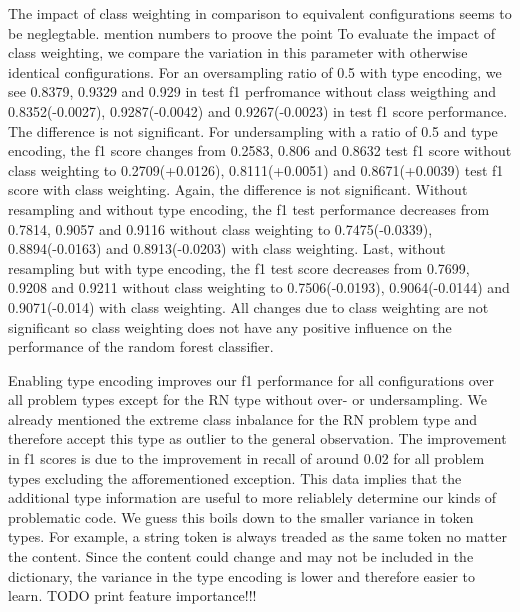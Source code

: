 The impact of class weighting in comparison to equivalent configurations seems to be neglegtable. 
mention numbers to proove the point
To evaluate the impact of class weighting, we compare the variation in this parameter with otherwise identical configurations.
For an oversampling ratio of 0.5 with type encoding, we see 0.8379, 0.9329 and 0.929 in test f1 perfromance without class weigthing and 0.8352(-0.0027), 0.9287(-0.0042) and 0.9267(-0.0023) in test f1 score performance. The difference is not significant.
For undersampling with a ratio of 0.5 and type encoding, the f1 score changes from 0.2583, 0.806 and 0.8632 test f1 score without class weighting to 0.2709(+0.0126), 0.8111(+0.0051) and 0.8671(+0.0039) test f1 score with class weighting. Again, the difference is not significant.
Without resampling and without type encoding, the f1 test performance decreases from 0.7814, 0.9057 and 0.9116 without class weighting to 0.7475(-0.0339), 0.8894(-0.0163) and 0.8913(-0.0203) with class weighting.
Last, without resampling but with type encoding, the f1 test score decreases from 0.7699, 0.9208 and 0.9211 without class weighting to 0.7506(-0.0193), 0.9064(-0.0144) and 0.9071(-0.014) with class weighting.
All changes due to class weighting are not significant so class weighting does not have any positive influence on the performance of the random forest classifier.

Enabling type encoding improves our f1 performance for all configurations over all problem types except for the RN type without over- or undersampling. We already mentioned the extreme class inbalance for the RN problem type and therefore accept this type as outlier to the general observation. The improvement in f1 scores is due to the improvement in recall of around 0.02 for all problem types excluding the afforementioned exception. This data implies that the additional type information are useful to more reliablely determine our kinds of problematic code. We guess this boils down to the smaller variance in token types. For example, a string token is always treaded as the same token no matter the content. Since the content could change and may not be included in the dictionary, the variance in the type encoding is lower and therefore easier to learn. TODO print feature importance!!!

